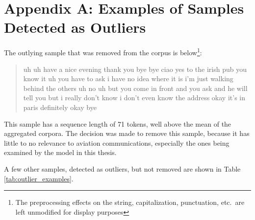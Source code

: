 \documentclass[12pt]{article}
\begin{document}
\newpage
\section{Appendix A: Examples of Samples Detected as Outliers}\label{sec:appendix_a}
The outlying sample that was removed from the corpus is below\footnote{The preprocessing effects on the string, capitalization, punctuation, etc.~are
    left unmodified for display purposes}:

\begin{quote}
    uh uh have a nice evening thank you bye bye ciao yes to the irish pub you know it uh you have to ask i have no idea where it is i'm just walking
    behind the others uh no uh but you come in front and you ask and he will tell you but i really don't know i don't even know the address okay it's
    in paris definitely okay bye
\end{quote}

This sample has a sequence length of 71 tokens, well above the mean of the aggregated corpora. The decision was made to remove this sample, because
it has little to no relevance to aviation communications, especially the ones being examined by the model in this thesis.

A few other samples, detected as outliers, but not removed are shown in Table \ref{tab:outlier_examples}.
\end{document}
